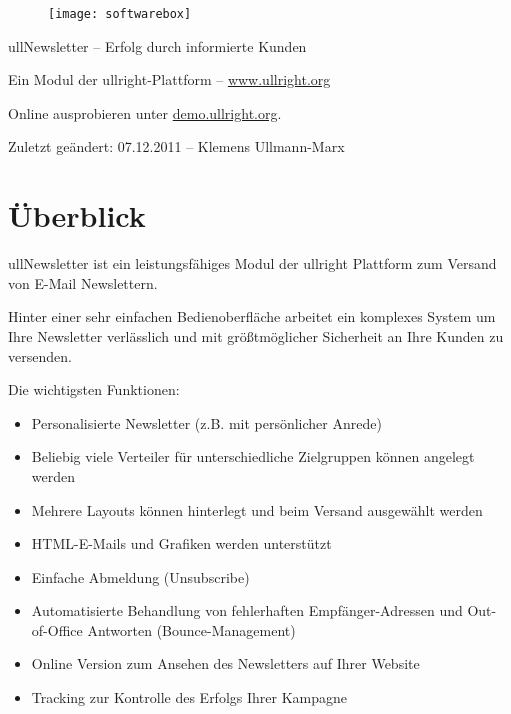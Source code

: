 \documentclass[article, a4paper, oneside, 11pt]{memoir}
\begin{document}
\vspace*{3cm}
\begin{figure}[htp]
\centering
\texttt{[image: softwarebox]}
\end{figure}

\vspace{3cm}


{
\huge
\color{ullblue}
ullNewsletter -- Erfolg durch informierte Kunden
}

\vspace{1cm}

Ein Modul der ullright-Plattform -- \href{http://www.ullright.org}{www.ullright.org}

Online ausprobieren unter \href{http://demo.ullright.org}{demo.ullright.org}. 

Zuletzt geändert: 07.12.2011 -- Klemens Ullmann-Marx

\clearpage

\pagestyle{plain}

\setcounter{secnumdepth}{2}
\setcounter{tocdepth}{2}
\tableofcontents*

\clearpage

\chapter{Überblick}

ullNewsletter ist ein leistungsfähiges Modul der ullright Plattform zum Versand von E-Mail Newslettern.

Hinter einer sehr einfachen Bedienoberfläche arbeitet ein komplexes System um Ihre Newsletter verlässlich und mit größtmöglicher Sicherheit an Ihre Kunden zu versenden.

Die wichtigsten Funktionen:

\begin{itemize}
 \item Personalisierte Newsletter (z.B. mit persönlicher Anrede)
 \item Beliebig viele Verteiler für unterschiedliche Zielgruppen können angelegt werden
 \item Mehrere Layouts können hinterlegt und beim Versand ausgewählt werden
 \item HTML-E-Mails und Grafiken werden unterstützt
 \item Einfache Abmeldung (Unsubscribe)
 \item Automatisierte Behandlung von fehlerhaften Empfänger-Adressen und Out-of-Office Antworten (Bounce-Management)
 \item Online Version zum Ansehen des Newsletters auf Ihrer Website
 \item Tracking zur Kontrolle des Erfolgs Ihrer Kampagne
\end{itemize}
\end{document}
